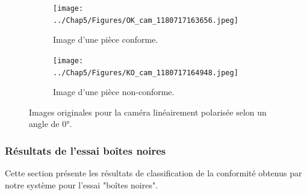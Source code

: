 \begin{figure}[hbtp]
	\centering
	\begin{subfigure}[c]{0.49\textwidth}
		\texttt{[image: ../Chap5/Figures/OK\_cam\_1180717163656.jpeg]}
		\caption{Image d'une pièce conforme.}
	\end{subfigure}
	\begin{subfigure}[c]{0.49\textwidth}
		\texttt{[image: ../Chap5/Figures/KO\_cam\_1180717164948.jpeg]}
		\caption{Image d'une pièce non-conforme.}
	\end{subfigure}
	\caption{Images originales pour la caméra linéairement polarisée selon un angle de 0°.}
	\label{fig:IPC_ok_ko}
\end{figure}

\subsubsection{Résultats de l'essai boîtes noires}
Cette section présente les résultats de classification de la conformité obtenus par notre système pour l'essai "boîtes noires".

